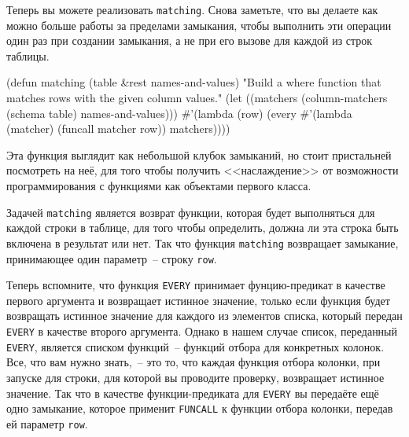 Теперь вы можете реализовать \lstinline{matching}.  Снова заметьте, что вы делаете как можно
больше работы за пределами замыкания, чтобы выполнить эти операции один раз при создании
замыкания, а не при его вызове для каждой из строк таблицы.

\begin{myverb}
(defun matching (table &rest names-and-values)
  "Build a where function that matches rows with the given column values."
  (let ((matchers (column-matchers (schema table) names-and-values)))
    #'(lambda (row)
        (every #'(lambda (matcher) (funcall matcher row)) matchers))))
\end{myverb}

Эта функция выглядит как небольшой клубок замыканий, но стоит пристальней посмотреть на
неё, для того чтобы получить <<наслаждение>> от возможности программирования с функциями
как объектами первого класса.

Задачей \lstinline{matching} является возврат функции, которая будет выполняться для каждой
строки в таблице, для того чтобы определить, должна ли эта строка быть включена в
результат или нет.  Так что функция \lstinline{matching} возвращает замыкание, принимающее один
параметр~-- строку \lstinline{row}.

Теперь вспомните, что функция \lstinline{EVERY} принимает фунцию-предикат в качестве первого
аргумента и возвращает истинное значение, только если функция будет возвращать истинное
значение для каждого из элементов списка, который передан \lstinline{EVERY} в качестве второго
аргумента.  Однако в нашем случае список, переданный \lstinline{EVERY}, является списком
функций~-- функций отбора для конкретных колонок.  Все, что вам нужно знать,~-- это то,
что каждая функция отбора колонки, при запуске для строки, для которой вы проводите
проверку, возвращает истинное значение.  Так что в качестве функции-предиката для
\lstinline{EVERY} вы передаёте ещё одно замыкание, которое применит \lstinline{FUNCALL} к функции
отбора колонки, передав ей параметр \lstinline{row}.

